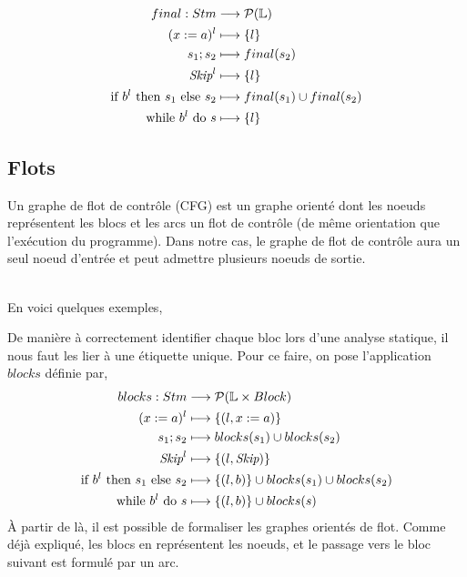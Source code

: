 \documentclass[a4paper, 12pt]{article}
\begin{document}
\begin{align*}
	final : Stm &\longrightarrow \mathcal{P}(\mathbb{L})\\
	({x}\space:=\space{a})^l &\longmapsto \{l\}\\
	{s_1}\space;\space{s_2} &\longmapsto final(s_2)\\
	\textit{Skip}^l &\longmapsto \{l\}\\
	\text{if }{b^l}\text{ then }{s_1}\text{ else }{s_2} &\longmapsto final(s_1) \cup final(s_2)\\
	\text{while }{b^l}\text{ do }{s} &\longmapsto \{l\}
\end{align*}

\subsection{Flots}
\begin{definition}
	Un graphe de flot de contrôle (CFG) est un graphe orienté dont les noeuds représentent les blocs et les arcs un
	flot de contrôle (de même orientation que l'exécution du programme). Dans notre cas, le graphe de flot de
	contrôle aura un seul noeud d'entrée et peut admettre plusieurs noeuds de sortie.
\end{definition}
\\
En voici quelques exemples,
\begin{center}\end{center}

De manière à correctement identifier chaque bloc lors d'une analyse statique, il nous faut les lier à une étiquette
unique. Pour ce faire, 
on pose l'application $blocks$ définie par,
\begin{align*}
	blocks : Stm &\longrightarrow \mathcal{P}(\mathbb{L} \times Block)\\
	({x}\space:=\space{a})^l&\longmapsto\{(l, x := a)\}\\
	{s_1}\space;\space{s_2} &\longmapsto blocks(s_1) \cup blocks(s_2)\\
	\textit{Skip}^l &\longmapsto \{(l, \textit{Skip})\}\\
	\text{if }{b^l}\text{ then }{s_1}\text{ else }{s_2} &\longmapsto \{(l, b)\}\cup blocks(s_1)\cup blocks(s_2)\\
	\text{while }{b^l}\text{ do }{s} &\longmapsto \{(l, b)\}\cup blocks(s)
\end{align*}
À partir de là, il est possible de formaliser les graphes orientés de flot. Comme déjà expliqué, les blocs en représentent les noeuds, 
et le passage vers le bloc suivant est formulé par un arc.
\end{document}
